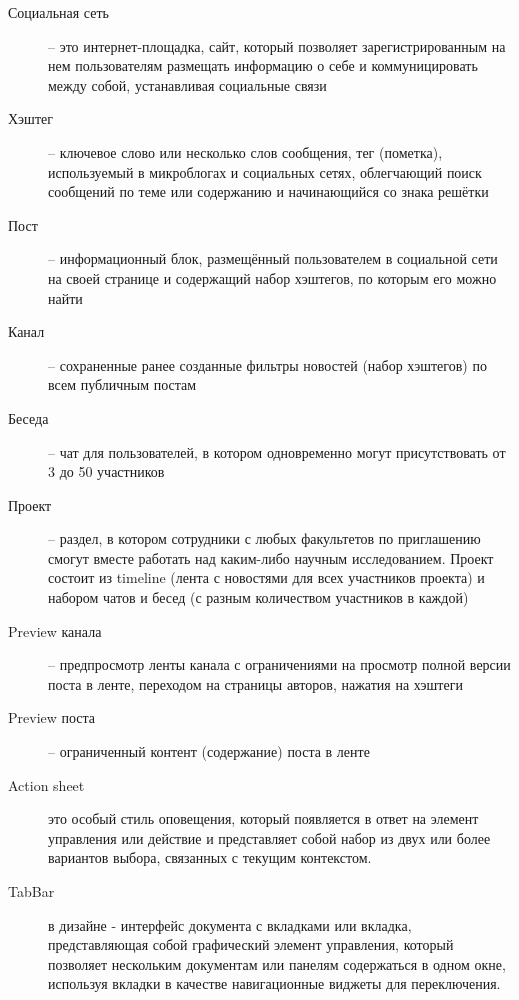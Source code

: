 \documentclass[a4paper,12pt]{article}
\begin{document}
	\begin{description}
		\item[Социальная сеть] -- это интернет-площадка, сайт, который позволяет зарегистрированным на нем пользователям размещать информацию о себе и коммуницировать между собой, устанавливая социальные связи
		\item[Хэштег] -- ключевое слово или несколько слов сообщения, тег (пометка), используемый в микроблогах и социальных сетях, облегчающий поиск сообщений по теме или содержанию и начинающийся со знака решётки \label{term: hash}
		\item[Пост] -- информационный блок, размещённый пользователем в социальной сети на своей странице и содержащий набор хэштегов, по которым его можно найти \label{term: post}
		\item[Канал] -- сохраненные ранее созданные фильтры новостей (набор хэштегов) по всем публичным постам \label{term: channel}
		\item [Беседа] -- чат для пользователей, в котором одновременно могут присутствовать от 3 до 50 участников \label{term: chat}
		\item [Проект]  -- раздел, в котором сотрудники с любых факультетов по приглашению смогут вместе работать над каким-либо научным исследованием. Проект состоит из timeline (лента с новостями для всех участников проекта) и набором чатов и бесед (с разным количеством участников в каждой) \label{term: project}
		\item [Preview канала]  -- предпросмотр ленты канала с ограничениями на просмотр полной версии поста в ленте, переходом на страницы авторов, нажатия на хэштеги \label{term: preview}
		\item [Preview поста]  -- ограниченный контент (содержание) поста в ленте \label{term: previewPost}
		\item [Action sheet] это особый стиль оповещения, который появляется в ответ на элемент управления или действие и представляет собой набор из двух или более вариантов выбора, связанных с текущим контекстом. \label{C: actionSheet}
		\item [TabBar] в дизайне - интерфейс документа с вкладками или вкладка, представляющая  собой графический элемент управления, который позволяет нескольким документам или панелям содержаться в одном окне, используя вкладки в качестве навигационные виджеты для переключения. \label{C: tabbar}
	\end{description}
	
	
	
	\listRegistration
\end{document}

